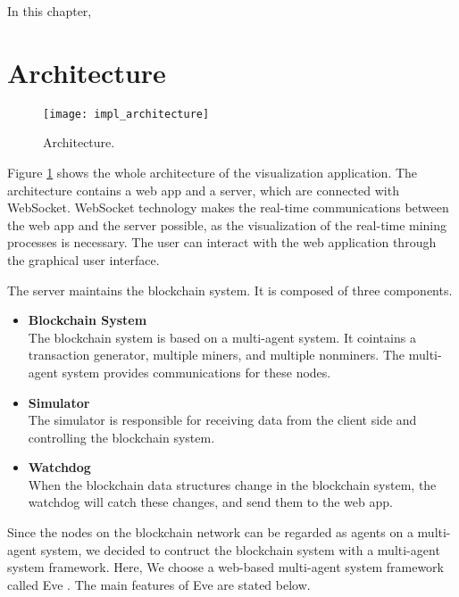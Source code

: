 In this chapter, 

\section{Architecture}

\begin{figure}[htb]
    \centering
    \texttt{[image: impl\_architecture]}
    \caption{Architecture.}
    \label{fig:architecture}
\end{figure}

Figure \ref{fig:architecture} shows the whole architecture of the visualization application. The architecture contains a web app and a server, which are connected with WebSocket. WebSocket technology makes the real-time communications between the web app and the server possible, as the visualization of the real-time mining processes is necessary. The user can interact with the web application through the graphical user interface.

The server maintains the blockchain system. It is composed of three components.

\begin{itemize}
    \item \textbf{Blockchain System} \\
        The blockchain system is based on a multi-agent system. It cointains a transaction generator, multiple miners, and multiple nonminers. The multi-agent system provides communications for these nodes.
    \item \textbf{Simulator} \\
        The simulator is responsible for receiving data from the client side and controlling the blockchain system.
    \item \textbf{Watchdog} \\
        When the blockchain data structures change in the blockchain system, the watchdog will catch these changes, and send them to the web app. 
\end{itemize}

Since the nodes on the blockchain network can be regarded as agents on a multi-agent system, we decided to contruct the blockchain system with a multi-agent system framework. Here, We choose a web-based multi-agent system framework called Eve \cite{eve}. The main features of Eve are stated below.

